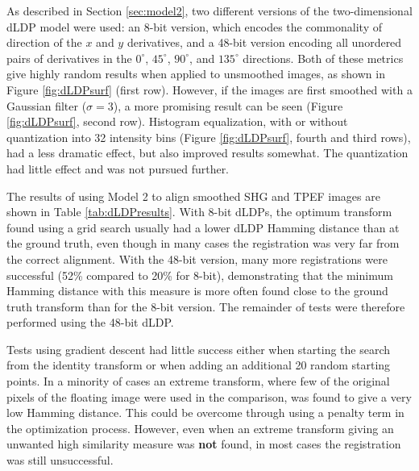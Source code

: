 \documentclass{report}
\begin{document}
As described in Section \ref{sec:model2}, two different versions of the two-dimensional dLDP model were used: an 8-bit version, which encodes the commonality of direction of the $x$ and $y$ derivatives, and a 48-bit version encoding all unordered pairs of derivatives in the $0^{\circ}$, $45^{\circ}$, $90^{\circ}$, and $135^{\circ}$ directions. Both of these metrics give highly random results when applied to unsmoothed images, as shown in Figure \ref{fig:dLDPsurf} (first row). However, if the images are first smoothed with a Gaussian filter ($\sigma=3$), a more promising result can be seen (Figure \ref{fig:dLDPsurf}, second row). Histogram equalization, with or without quantization into 32 intensity bins (Figure \ref{fig:dLDPsurf}, fourth and third rows), had a less dramatic effect, but also improved results somewhat. The quantization had little effect and was not pursued further.

The results of using Model 2 to align smoothed SHG and TPEF images are shown in Table \ref{tab:dLDPresults}. With 8-bit dLDPs, the optimum transform found using a grid search usually had a lower dLDP Hamming distance than at the ground truth, even though in many cases the registration was very far from the correct alignment. With the 48-bit version, many more registrations were successful (52\% compared to 20\% for 8-bit), demonstrating that the minimum Hamming distance with this measure is more often found close to the ground truth transform than for the 8-bit version. The remainder of tests were therefore performed using the 48-bit dLDP.

Tests using gradient descent had little success either when starting the search from the identity transform or when adding an additional 20 random starting points. In a minority of cases an extreme transform, where few of the original pixels of the floating image were used in the comparison, was found to give a very low Hamming distance. This could be overcome through using a penalty term in the optimization process. However, even when an extreme transform giving an unwanted high similarity measure was \textbf{not} found, in most cases the registration was still unsuccessful.
\end{document}
